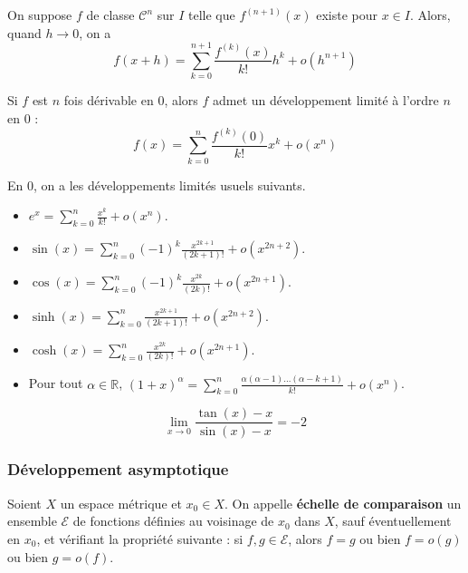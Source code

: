   \begin{theorem}
    On suppose $f$ de classe $\mathcal{C}^n$ sur $I$ telle que $f^{(n+1)}(x)$ existe pour $x \in I$. Alors, quand $h \longrightarrow 0$, on a
    \[ f(x+h) = \sum_{k=0}^{n+1} \frac{f^{(k)} (x)}{k!} h^k + o(h^{n+1}) \]
  \end{theorem}

  \begin{proposition}
    Si $f$ est $n$ fois dérivable en $0$, alors $f$ admet un développement limité à l'ordre $n$ en $0$ :
    \[ f(x) = \sum_{k=0}^{n} \frac{f^{(k)} (0)}{k!} x^k + o(x^{n}) \]
  \end{proposition}

  \begin{example}
    En $0$, on a les développements limités usuels suivants.
    \begin{itemize}
      \item $e^x = \sum_{k=0}^{n} \frac{x^k}{k!} + o(x^n)$.
      \item $\sin(x) = \sum_{k=0}^{n} (-1)^{k} \frac{x^{2k+1}}{(2k+1)!} + o(x^{2n+2})$.
      \item $\cos(x) = \sum_{k=0}^{n} (-1)^{k} \frac{x^{2k}}{(2k)!} + o(x^{2n+1})$.
      \item $\sinh(x) = \sum_{k=0}^{n} \frac{x^{2k+1}}{(2k+1)!} + o(x^{2n+2})$.
      \item $\cosh(x) = \sum_{k=0}^{n} \frac{x^{2k}}{(2k)!} + o(x^{2n+1})$.
      \item Pour tout $\alpha \in \mathbb{R}$, $(1+x)^\alpha = \sum_{k=0}^n \frac{\alpha(\alpha - 1) \dots (\alpha -k+1)}{k!} + o(x^n)$.
    \end{itemize}
  \end{example}

  \begin{application}
    \[ \lim_{x \rightarrow 0} \frac{\tan(x) - x}{\sin(x) - x} = -2 \]
  \end{application}

  \subsubsection{Développement asymptotique}

  \begin{definition}
    Soient $X$ un espace métrique et $x_0 \in X$. On appelle \textbf{échelle de comparaison} un ensemble $\mathcal{E}$ de fonctions définies au voisinage de $x_0$ dans $X$, sauf éventuellement en $x_0$, et vérifiant la propriété suivante : si $f, g \in \mathcal{E}$, alors $f = g$ ou bien $f = o(g)$ ou bien $g = o(f)$.
  \end{definition}

